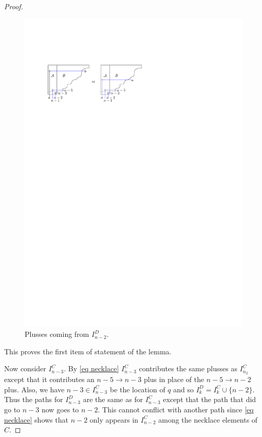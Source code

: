 \documentclass[11pt]{article}
\theoremstyle{remark}
\theoremstyle{definition}
\begin{document}
\begin{proof}
  \begin{figure}
    \includegraphics{messyD}
    \caption{Plusses coming from $I_{n-2}^{D}$.}\label{fig messyD}
  \end{figure}

  This proves the first item of statement of the lemma.

  Now consider $I_{n-3}^{C}$.  By \eqref{eq necklace} $I_{n-3}^{C}$ contributes the same plusses as $I_{n_2}^{C}$ except that it contributes an $n-5\rightarrow n-3$ plus in place of the $n-5\rightarrow n-2$ plus.  Also, we have $n-3\in I_{n-3}^{C}$ be the location of $q$ and so $I_{k}^{D} = I_k^{C}\cup\{n-2\}$.  Thus the paths for $I^{D}_{n-3}$ are the same as for $I^{C}_{n-3}$ except that the path that did go to $n-3$ now goes to $n-2$.  This cannot conflict with another path since \eqref{eq necklace} shows that $n-2$ only appears in $I_{n-2}^{C}$ among the necklace elements of $C$.


\end{proof}
\end{document}
